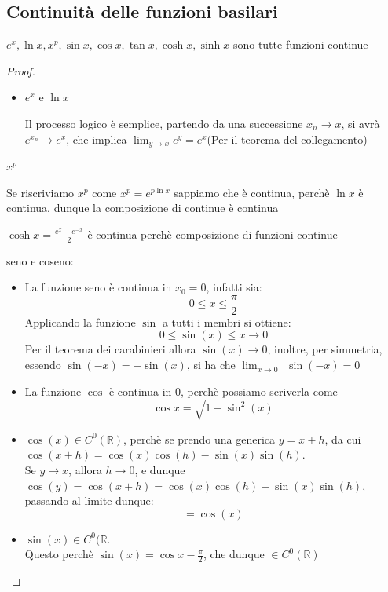 \documentclass{article}
\theoremstyle{definition}
\begin{document}
\subsection{Continuità delle funzioni basilari}
$e^x,\ln{x},x^p,\sin{x},\cos{x},\tan{x},\cosh{x},\sinh{x}$ sono tutte funzioni continue
\begin{proof}
    \begin{itemize}
        \item \begin{center}
            $e^x$ e $\ln{x}$
        \end{center}
        Il processo logico è semplice, partendo da una successione $x_n \to x$, si avrà $e^{x_n}\to e^x$, che implica $\lim_{y \to x}e^y=e^x$(Per il teorema del collegamento)
    \end{itemize}
    \begin{center}
        $x^p$
    \end{center}
    Se riscriviamo $x^p$ come $x^p=e^{p\ln{x}}$ sappiamo che è continua, perchè $\ln{x}$ è continua, dunque la composizione di continue è continua
    \begin{center}
        $\cosh{x}=\frac{e^x-e^{-x}}{2}$ è continua perchè composizione di funzioni continue
    \end{center}
    \begin{center}
       seno e coseno:
    \end{center}
    \begin{itemize}
        \item La funzione seno è continua in $x_0=0$, infatti sia:
        \begin{equation}
            0 \leqslant x \leqslant \frac{\pi}{2}
        \end{equation}
        Applicando la funzione $\sin$ a tutti i membri si ottiene:
        \begin{equation}
            0 \leqslant \sin{(x)} \leqslant x \to 0
        \end{equation}
        Per il teorema dei carabinieri allora $\sin{(x)} \to 0$, inoltre, per simmetria, essendo $\sin{(-x)}=-\sin{(x)}$, si ha che $\lim_{x \to 0^-}\sin{(-x)}=0$
        \item La funzione $\cos$ è continua in 0, perchè possiamo scriverla come
        \begin{equation}
            \cos{x}=\sqrt{1-\sin^2{(x)}}
        \end{equation}
        \item $\cos{(x)} \in C^0(\mathbb{R})$, perchè se prendo una generica $y=x+h$, da cui $\cos{(x+h)}=\cos{(x)}\cos{(h)}-\sin{(x)}\sin{(h)}$.
        \\
        Se $y \to x$, allora $h \to 0$, e dunque $\cos{(y)}=\cos{(x+h)}=\cos{(x)}\cos{(h)}-\sin{(x)}\sin{(h)}$, passando al limite dunque:
        \begin{equation}
            =\cos{(x)}
        \end{equation}
        \item $\sin{(x)} \in C^0(\mathbb{R}$.
        \\
        Questo perchè $\sin{(x)}=\cos{x-\frac{\pi}{2}}$, che dunque $\in C^0(\mathbb{R})$
    \end{itemize}
\end{proof}
\end{document}
